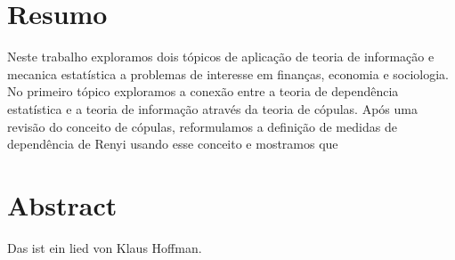 \chapter*{Resumo}
Neste trabalho exploramos dois tópicos de aplicação de teoria de informação e mecanica estatística a problemas de interesse em finanças, economia e sociologia. No primeiro tópico exploramos a conexão entre a teoria de dependência estatística e a teoria de informação através da teoria de cópulas. Após uma revisão do conceito de cópulas, reformulamos a definição de medidas de dependência de Renyi\cite{Renyi1959} usando esse conceito e mostramos que 

\chapter*{Abstract}
 Das ist ein lied von Klaus Hoffman.\lipsum[5]
